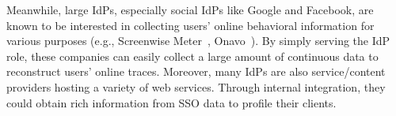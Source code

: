 

Meanwhile, large IdPs, especially social IdPs like Google and Facebook, are known to be interested in collecting users' online behavioral information for various purposes (e.g., Screenwise Meter~\cite{googlenews}, Onavo~\cite{Onavo}). By simply serving the IdP role, these companies can easily collect a large amount of continuous data to reconstruct users' online traces. %
Moreover, many IdPs are also service/content providers hosting a variety of web services. Through internal integration, they could obtain rich information from SSO data to profile their clients.


